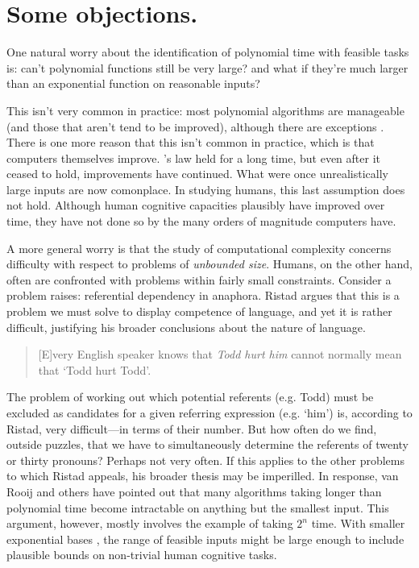 \section*{Some objections.}
One natural worry about the identification of polynomial time with feasible tasks is: can’t polynomial functions still be very large? and what if they’re much larger than an exponential function on reasonable inputs?

This isn’t very common in practice: most polynomial algorithms are manageable (and those that aren’t tend to be improved), although there are exceptions \parencite{helfgott2019}. There is one more reason that this isn’t common in practice, which is that computers themselves improve. \textcite{moore1965}’s law held for a long time, but even after it ceased to hold, improvements have continued. What were once unrealistically large inputs are now comonplace. In studying humans, this last assumption does not hold. Although human cognitive capacities plausibly have improved over time, they have not done so by the many orders of magnitude computers have.

A more general worry is that the study of computational complexity concerns difficulty with respect to problems of \emph{unbounded size}. Humans, on the other hand, often are confronted with problems within fairly small constraints. Consider a problem \textcite[cap 4]{ristad1993} raises: referential dependency in anaphora. Ristad argues that this is a problem we must solve to display competence of language, and yet it is rather difficult, justifying his broader conclusions about the nature of language.
\begin{quote}
    [E]very English speaker knows that \emph{Todd hurt him} cannot normally mean that `Todd hurt Todd'.
\end{quote}
The problem of working out which potential referents (e.g. Todd) must be excluded as candidates for a given referring expression (e.g. ‘him’) is, according to Ristad, very difficult—in terms of their number. But how often do we find, outside puzzles, that we have to simultaneously determine the referents of twenty or thirty pronouns? Perhaps not very often. If this applies to the other problems to which Ristad appeals, his broader thesis may be imperilled. In response, van Rooij and others have pointed out that many algorithms taking longer than polynomial time become intractable on anything but the smallest input. This argument, however, mostly involves the example of taking \(2^n\) time. With smaller exponential bases \parencite[see e.g.][]{hansen2019}, the range of feasible inputs might be large enough to include plausible bounds on non-trivial human cognitive tasks.